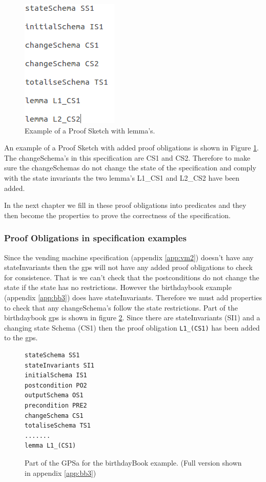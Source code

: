 \begin{figure}[H]
\centering
\includegraphics[scale=0.5]{Figures/skeleton/proofskeletonwithpo.png}
\caption{Example of a Proof Sketch with lemma's.}
\label{fig:gpswithpo}
\end{figure}

An example of a Proof Sketch with added proof obligations is shown in
Figure \ref{fig:gpswithpo}. The changeSchema's in this specification are CS1 and
CS2. Therefore to make sure the changeSchemas do not change the state of the
specification and comply with the state invariants the two lemma's L1\_CS1 and
L2\_CS2 have been added.

In the next chapter we fill in these proof obligations into predicates and they 
then become the properties to prove the correctness of the specification.

\subsubsection{Proof Obligations in specification examples}
Since the vending machine specification (appendix \ref{app:vm2}) doesn't have
any stateInvariants then the \gls{gps} will not have any added proof
obligations to check for consistence. That is we can't check that the
postconditions do not change the state if the state has no restrictions. However
the birthdaybook example (appendix \ref{app:bb3}) does have stateInvariants.
Therefore we must add properties to check that any changeSchema's follow the
state restrictions. Part of the birthdaybook \gls{gps} is shown in figure
\ref{fig:bbgps}. Since there are stateInvariants (SI1) and a changing state
Schema (CS1) then the proof obligation \texttt{L1\_(CS1)} has been added to the
\gls{gps}.

\begin{figure}[H]
\begin{verbatim}
stateSchema SS1 
stateInvariants SI1 
initialSchema IS1 
postcondition PO2 
outputSchema OS1 
precondition PRE2 
changeSchema CS1 
totaliseSchema TS1 
.......
lemma L1_(CS1) 
\end{verbatim}
\caption{Part of the GPSa for the birthdayBook example. (Full version shown in appendix \ref{app:bb3}) \label{fig:bbgps}}
\end{figure}


